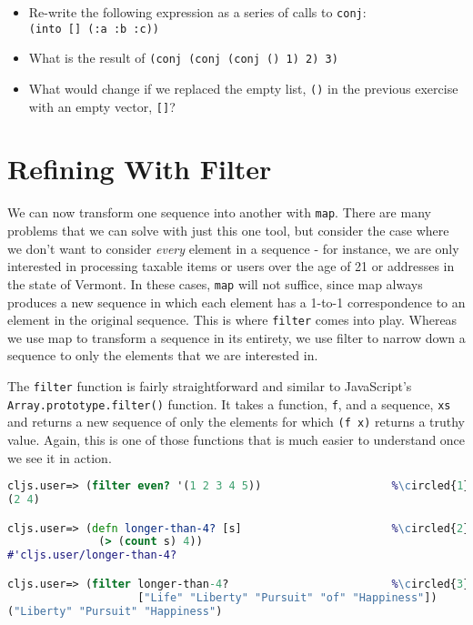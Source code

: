 \documentclass[10pt,twoside,openright]{memoir}
\newcommand*\circled[1]{\tikz[baseline=(char.base)]{
            \node[shape=circle,draw,inner sep=1pt] (char) {#1};}}
\begin{document}
\begin{itemize}
\tightlist
\item
  Re-write the following expression as a series of calls to
  \texttt{conj}: \texttt{(into\ {[}{]}\ \textquotesingle{}(:a\ :b\ :c))}
\item
  What is the result of
  \texttt{(conj\ (conj\ (conj\ \textquotesingle{}()\ 1)\ 2)\ 3)}
\item
  What would change if we replaced the empty list,
  \texttt{\textquotesingle{}()} in the previous exercise with an empty
  vector, \texttt{{[}{]}}?
\end{itemize}


\section{Refining With Filter}

We can now transform one sequence into another with \texttt{map}. There
are many problems that we can solve with just this one tool, but
consider the case where we don't want to consider \emph{every} element
in a sequence - for instance, we are only interested in processing
taxable items or users over the age of 21 or addresses in the state of
Vermont. In these cases, \texttt{map} will not suffice, since map always
produces a new sequence in which each element has a 1-to-1
correspondence to an element in the original sequence. This is where
\texttt{filter} comes into play. Whereas we use map to transform a
sequence in its entirety, we use filter to narrow down a sequence to
only the elements that we are interested in.

The \texttt{filter} function is fairly straightforward and similar to
JavaScript's \texttt{Array.prototype.filter()} function. It takes a
function, \texttt{f}, and a sequence, \texttt{xs} and returns a new
sequence of only the elements for which \texttt{(f\ x)} returns a truthy
value. Again, this is one of those functions that is much easier to
understand once we see it in action.

\begin{lstlisting}[language=Clojure, caption={Filtering a sequence}]
cljs.user=> (filter even? '(1 2 3 4 5))                    %\circled{1}%
(2 4)

cljs.user=> (defn longer-than-4? [s]                       %\circled{2}%
              (> (count s) 4))
#'cljs.user/longer-than-4?

cljs.user=> (filter longer-than-4?                         %\circled{3}%
                    ["Life" "Liberty" "Pursuit" "of" "Happiness"])
("Liberty" "Pursuit" "Happiness")
\end{lstlisting}
\end{document}

